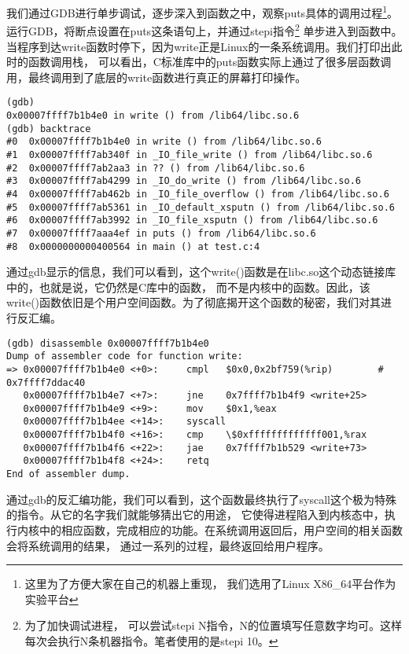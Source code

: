 我们通过GDB进行单步调试，逐步深入到函数之中，观察puts具体的调用过程\footnote{这里为了方便大家在自己的机器上重现，
我们选用了Linux X86\_64平台作为实验平台}。运行GDB，将断点设置在puts这条语句上，并通过stepi指令\footnote{为了加快调试进程，
可以尝试stepi N指令，N的位置填写任意数字均可。这样每次会执行N条机器指令。笔者使用的是stepi 10。}
单步进入到函数中。当程序到达write函数时停下，因为write正是Linux的一条系统调用。我们打印出此时的函数调用栈，
可以看出，C标准库中的puts函数实际上通过了很多层函数调用，最终调用到了底层的write函数进行真正的屏幕打印操作。

\begin{verbatim}
(gdb) 
0x00007ffff7b1b4e0 in write () from /lib64/libc.so.6
(gdb) backtrace
#0  0x00007ffff7b1b4e0 in write () from /lib64/libc.so.6
#1  0x00007ffff7ab340f in _IO_file_write () from /lib64/libc.so.6
#2  0x00007ffff7ab2aa3 in ?? () from /lib64/libc.so.6
#3  0x00007ffff7ab4299 in _IO_do_write () from /lib64/libc.so.6
#4  0x00007ffff7ab462b in _IO_file_overflow () from /lib64/libc.so.6
#5  0x00007ffff7ab5361 in _IO_default_xsputn () from /lib64/libc.so.6
#6  0x00007ffff7ab3992 in _IO_file_xsputn () from /lib64/libc.so.6
#7  0x00007ffff7aaa4ef in puts () from /lib64/libc.so.6
#8  0x0000000000400564 in main () at test.c:4
\end{verbatim}

通过gdb显示的信息，我们可以看到，这个write()函数是在libc.so这个动态链接库中的，也就是说，它仍然是C库中的函数，
而不是内核中的函数。因此，该write()函数依旧是个用户空间函数。为了彻底揭开这个函数的秘密，我们对其进行反汇编。

\begin{verbatim}
(gdb) disassemble 0x00007ffff7b1b4e0
Dump of assembler code for function write:
=> 0x00007ffff7b1b4e0 <+0>:     cmpl   $0x0,0x2bf759(%rip)        # 0x7ffff7ddac40
   0x00007ffff7b1b4e7 <+7>:     jne    0x7ffff7b1b4f9 <write+25>
   0x00007ffff7b1b4e9 <+9>:     mov    $0x1,%eax
   0x00007ffff7b1b4ee <+14>:    syscall 
   0x00007ffff7b1b4f0 <+16>:    cmp    \$0xfffffffffffff001,%rax
   0x00007ffff7b1b4f6 <+22>:    jae    0x7ffff7b1b529 <write+73>
   0x00007ffff7b1b4f8 <+24>:    retq
End of assembler dump.
\end{verbatim}

通过gdb的反汇编功能，我们可以看到，这个函数最终执行了syscall这个极为特殊的指令。从它的名字我们就能够猜出它的用途，
它使得进程陷入到内核态中，执行内核中的相应函数，完成相应的功能。在系统调用返回后，用户空间的相关函数会将系统调用的结果，
通过一系列的过程，最终返回给用户程序。

